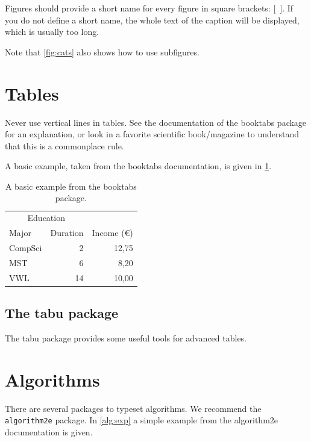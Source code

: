 \documentclass[12pt, %
a4paper, %
twoside, %
openright, %
abstract=on, %
DIV=11,      %
BCOR=8mm]{scrbook} %
\begin{document}
    Figures  should  provide a  short  name  for  every figure  in  square 
    brackets: $[$~$]$. If  you do not define a short  name, the whole text 
    of the caption will be displayed, which is usually too long.
    
    Note that \cref{fig:cats} also shows how to use subfigures.



    \section{Tables}
    Never  use vertical  lines in  tables.  See  the documentation  of the 
    booktabs package for an explanation,  or look in a favorite scientific 
    book/magazine to understand that this is a commonplace rule.

    A basic  example, taken  from the booktabs  documentation, is  given in
    \cref{tab::ex}.

    \begin{table}
        \centering
        \begin{tabular}{@{}lrr@{}} 
            \toprule
            \multicolumn{2}{c}{Education}\\ \cmidrule{1-2}
            Major & Duration & Income (\euro)\\ 
            \midrule 
            CompSci & 2 & 12,75 \\ \addlinespace
            MST & 6 & 8,20 \\ \addlinespace
            VWL & 14 & 10,00\\ 
            \bottomrule
        \end{tabular}
        \caption[Table Example]{A basic example from the booktabs package.}
        \label{tab::ex}
    \end{table}

    \subsection{The tabu package}
    The tabu package provides some useful tools for advanced tables.


    \section{Algorithms}
    There are several packages to typeset algorithms.
    We recommend the \verb+algorithm2e+ package.
    In \cref{alg:exp} a simple example from the algorithm2e documentation is given.
\end{document}
